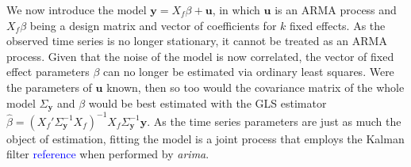 


We now introduce the model $\mathbf{y} = X_f\beta + \mathbf{u}$, in which $\mathbf{u}$ is an ARMA process and $X_f\beta$ being a design matrix and vector of coefficients for $k$ fixed effects. As the observed time series is no longer stationary, it cannot be treated as an ARMA process. Given that the noise of the model is now correlated, the vector of fixed effect parameters $\beta$ can no longer be estimated via ordinary least squares. Were the parameters of $\mathbf{u}$ known, then so too would the covariance matrix of the whole model $\Sigma_\mathbf{y}$ and $\beta$ would be best estimated with the GLS estimator $\hat{\beta} = (X_f'\Sigma_\mathbf{y}^{-1}X_f)^{-1}X_f\Sigma_\mathbf{y}^{-1}\mathbf{y}$. As the time series parameters are just as much the object of estimation, fitting the model is a joint process that employs the Kalman filter \textcolor{blue}{reference} when performed by \emph{arima}.